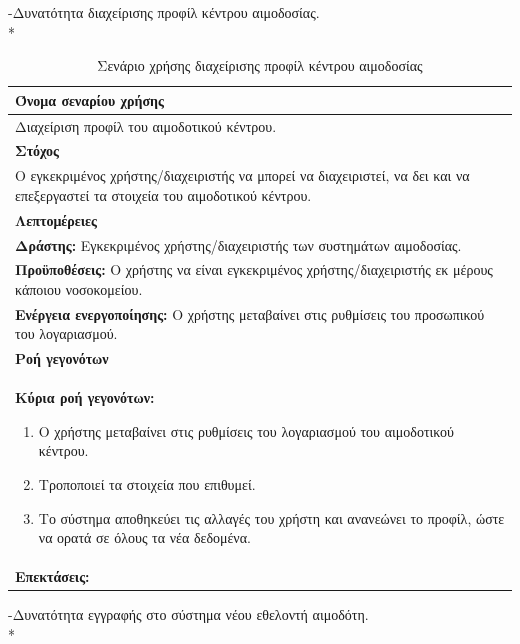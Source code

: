 \newpage
-Δυνατότητα διαχείρισης προφίλ κέντρου αιμοδοσίας.
\\*

\begin{table}[H]
	\begin{center}
	    \begin{tabular}{|p{\dimexpr \linewidth-2\tabcolsep}|}
	    \hline
	    \rowcolor{grayy}
	    \textbf{Όνομα σεναρίου χρήσης}
	    \\ \hline    
	    Διαχείριση προφίλ του αιμοδοτικού κέντρου. 
	     \\ \hline
	    \rowcolor{grayy}
	    \textbf{\textbf{Στόχος}}
	    \\ \hline
	 	 Ο εγκεκριμένος χρήστης/διαχειριστής να μπορεί να διαχειριστεί, να δει και να επεξεργαστεί τα στοιχεία του αιμοδοτικού κέντρου.
	    \\ \hline
	    \rowcolor{grayy}
	    \textbf{Λεπτομέρειες}
	    \\ \hline
		\textbf{Δράστης:} Εγκεκριμένος χρήστης/διαχειριστής των συστημάτων αιμοδοσίας.
		\\*
		\textbf{Προϋποθέσεις:} Ο χρήστης να είναι εγκεκριμένος χρήστης/διαχειριστής εκ μέρους κάποιου νοσοκομείου.
		\\*
		\textbf{Ενέργεια ενεργοποίησης:} Ο χρήστης μεταβαίνει στις ρυθμίσεις του προσωπικού του λογαριασμού.
		\\ \hline
		\rowcolor{grayy}    
	    \textbf{Ροή γεγονότων}
	    \\ \hline
		\textbf{Κύρια ροή γεγονότων:}
		\begin{enumerate}
			\item	 Ο χρήστης μεταβαίνει στις ρυθμίσεις του λογαριασμού του αιμοδοτικού κέντρου.
			\item Τροποποιεί τα στοιχεία που επιθυμεί.
			\item Το σύστημα αποθηκεύει τις αλλαγές του χρήστη και ανανεώνει το προφίλ, ώστε να ορατά σε όλους τα νέα δεδομένα.
		\end{enumerate}
		\\ \hline
		\rowcolor{grayy}
		\textbf{Επεκτάσεις:}
		   \\ \hline
	    \end{tabular}
	    \caption{Σενάριο χρήσης διαχείρισης προφίλ κέντρου αιμοδοσίας}
	    \label{tab:blood_center_account_management}
	\end{center}
\end{table}	

\newpage
-Δυνατότητα εγγραφής στο σύστημα νέου εθελοντή αιμοδότη.
\\*	

